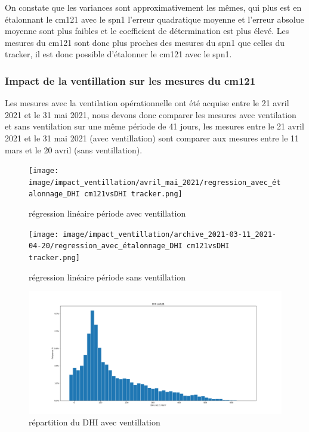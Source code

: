 \documentclass[12pt,a4paper]{article}
\begin{document}
\begin{flushleft}
On constate que les variances sont approximativement les mêmes, qui plus est en étalonnant le cm121 avec le spn1 l'erreur quadratique moyenne et l'erreur absolue moyenne sont plus faibles et le coefficient de détermination est plus élevé. Les mesures du cm121 sont donc plus proches des mesures du spn1 que celles du tracker, il est donc possible d'étalonner le cm121 avec le spn1.  

\subsubsection{Impact de la ventillation sur les mesures du cm121}

Les mesures avec la ventilation opérationnelle ont été acquise entre le 21 avril 2021 et le 31 mai 2021, nous devons donc comparer les mesures avec ventilation et sans ventilation sur une même période de 41 jours, les mesures entre le 21 avril 2021 et le 31 mai 2021 (avec ventillation) sont comparer aux mesures entre le 11 mars et le 20 avril (sans ventillation).

\begin{figure}[H]
\centering
\texttt{[image: image/impact\_ventillation/avril\_mai\_2021/regression\_avec\_étalonnage\_DHI cm121vsDHI tracker.png]} 
\caption{régression linéaire période avec ventillation}  
\end{figure}

\begin{figure}[H]
\centering
\texttt{[image: image/impact\_ventillation/archive\_2021-03-11\_2021-04-20/regression\_avec\_étalonnage\_DHI cm121vsDHI tracker.png]}  
\caption{régression linéaire période sans ventillation}  
\end{figure}

\begin{figure}[H]
\centering
\includegraphics[width=15cm]{image/impact_ventillation/avril_mai_2021/histogramme_3.png}  
\caption{répartition du DHI avec ventillation}  
\end{figure}


\end{flushleft}
\end{document}
